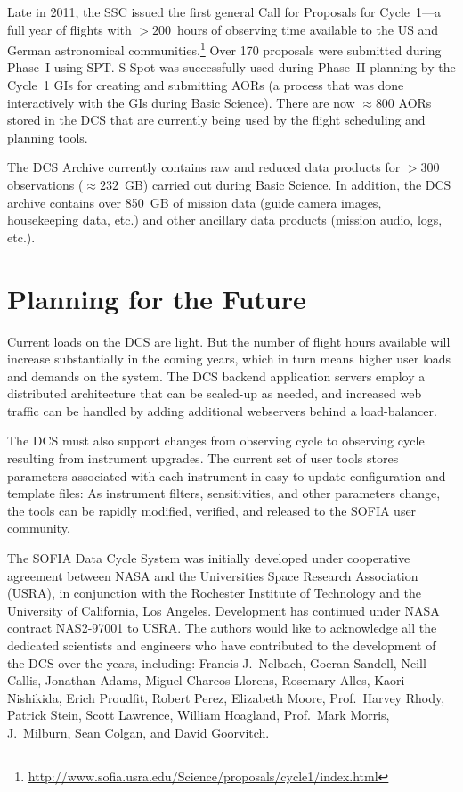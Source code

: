 Late in 2011, the SSC issued the first general Call for Proposals for Cycle~1---a full year of flights with $> 200$~hours of observing time available to the US and German astronomical communities.\footnote{
\url{http://www.sofia.usra.edu/Science/proposals/cycle1/index.html}}
Over 170 proposals were submitted during Phase~I using SPT.  S-Spot was successfully used during Phase~II planning by the Cycle~1 GIs for creating and submitting AORs (a process that was done interactively with the GIs during Basic Science).  There are now $\approx 800$ AORs  stored in the DCS that are currently being used by the flight scheduling and planning tools.


The DCS Archive currently contains raw and reduced data products for $> 300$ observations ($\approx 232$~GB) carried out during Basic Science. In addition, the DCS archive contains over 850~GB of mission data (guide camera images, housekeeping data, etc.) and other ancillary data products (mission audio, logs, etc.).  

\section{Planning for the Future}

Current loads on the DCS are light.  But the number of flight hours available will increase substantially in the coming years, which in turn means higher user loads and demands on the system.  The DCS backend application servers employ a distributed architecture that can be scaled-up as needed, and increased web traffic can be handled by adding additional webservers behind a load-balancer.  

The DCS must also support changes from observing cycle to observing cycle resulting from instrument upgrades.  The current set of user tools stores parameters associated with each instrument in easy-to-update configuration and template files:  As instrument filters, sensitivities, and other parameters change, the tools can be rapidly modified, verified, and released to the SOFIA user community.  


\acknowledgements 

The SOFIA Data Cycle System was initially developed under cooperative agreement between NASA and the Universities Space Research Association (USRA), in conjunction with the Rochester Institute of Technology and the University of California, Los Angeles. Development has continued under NASA contract NAS2-97001 to USRA. The authors would like to acknowledge  all the dedicated scientists and engineers who have contributed to the development of the DCS over the years, including:  Francis J.~Nelbach, 
Goeran Sandell, 
Neill Callis, 
Jonathan Adams, 
Miguel Charcos-Llorens, 
Rosemary Alles,
Kaori Nishikida,
Erich Proudfit, 
Robert Perez,
Elizabeth Moore,
Prof.~Harvey Rhody, 
Patrick Stein,
Scott Lawrence, 
William Hoagland,
Prof.~Mark Morris, 
J.~Milburn,
Sean Colgan,
and David Goorvitch.





